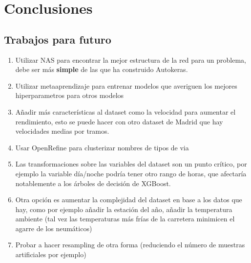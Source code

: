
\chapter{Conclusiones}
\label{conclusiones}



\section{Trabajos para futuro}

	\begin{enumerate}
		\item Utilizar NAS para encontrar la mejor estructura de la red para un problema, debe ser más \textbf{simple} de las que ha construido Autokeras.
		\item Utilizar metaaprendizaje para entrenar modelos que averiguen los mejores hiperparametros para otros modelos
		\item Añadir más características al dataset como la velocidad para aumentar el rendimiento, esto se puede hacer con otro dataset de Madrid que hay velocidades medias por tramos.
		\item Usar OpenRefine para clusterizar nombres de tipos de via
		\item Las transformaciones sobre las variables del dataset son un punto crítico, por ejemplo la variable día/noche podría tener otro rango de horas, que afectaría notablemente a los árboles de decisión de XGBoost.
		\item Otra opción es aumentar la complejidad del dataset en base a los datos que hay, como por ejemplo añadir la estación del año, añadir la temperatura ambiente (tal vez las temperaturas más frías de la carretera minimicen el agarre de los neumáticos)
		\item Probar a hacer resampling de otra forma (reduciendo el número de muestras artificiales por ejemplo)
	\end{enumerate}
